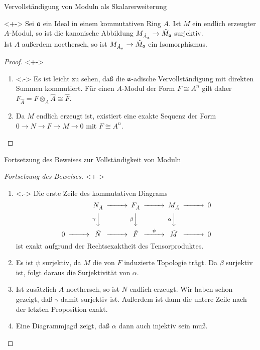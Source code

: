 \begin{frame}{Vervollständigung von Moduln als Skalarerweiterung}
	\begin{proposition}<+->
		\label{prop:compl_as_scalar_ext}
		Sei \(\mathfrak{a}\) ein Ideal in einem kommutativen Ring \(A\). Ist
		\(M\) ein endlich erzeugter \(A\)-Modul, so ist die kanonische
		Abbildung \(M_{\hat A_{\mathfrak{a}}} \to \hat M_{\mathfrak{a}}\) surjektiv.
		\\
		Ist \(A\) außerdem noethersch, so ist \(M_{\hat A_{\mathfrak{a}}} \to
		\hat M_{\mathfrak{a}}\) ein Isomorphismus.
	\end{proposition}
	\begin{proof}  <+->
		\begin{enumerate}[<+->]
		\item<.->
			Es ist leicht zu sehen, daß die \(\mathfrak{a}\)-adische
			Vervollständigung mit direkten Summen kommutiert. Für einen \(A\)-Modul
			der Form \(F \cong A^n\) gilt daher \(F_{\hat A} = F \otimes_A \hat A \cong \hat F\).
		\item
			Da \(M\) endlich erzeugt ist, existiert eine exakte Sequenz der
			Form \(0 \to N \to F \to M \to 0\) mit \(F \cong A^n\).
			\renewcommand{\qedsymbol}{}
			\qedhere
		\end{enumerate}
	\end{proof}
\end{frame}

\begin{frame}{Fortsetzung des Beweises zur Vollständigkeit von Moduln}
	\begin{proof}[Fortsetzung des Beweises]<+->
		\begin{enumerate}[<+->]
		\item<.->
			Die erste Zeile des kommutativen Diagrams
			\[
				\begin{CD}
					& & N_{\hat A} @>>> F_{\hat A} @>>> M_{\hat A} @>>> 0 \\
					& & @V{\gamma}VV @V{\beta}VV @V{\alpha}VV \\
					0 @>>> \hat N @>>> \hat F @>{\psi}>> \hat M @>>> 0
				\end{CD}
			\]
			ist exakt aufgrund der Rechtsexaktheit des Tensorproduktes.
		\item
			Es ist \(\psi\) surjektiv, da \(M\) die von \(F\) induzierte
			Topologie trägt. Da \(\beta\) surjektiv ist, folgt daraus die
			Surjektivität von \(\alpha\).
		\item
			Ist zusätzlich \(A\) noethersch, so ist \(N\) endlich erzeugt.
			Wir haben schon gezeigt, daß \(\gamma\) damit surjektiv ist.
			Außerdem ist dann die untere Zeile nach der letzten Proposition exakt.
		\item
			Eine Diagrammjagd zeigt, daß \(\alpha\) dann auch injektiv sein muß.
			\qedhere
		\end{enumerate}
	\end{proof}
\end{frame}

